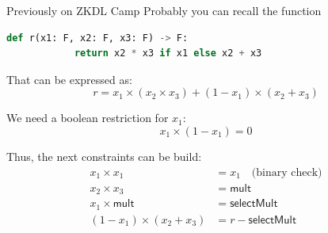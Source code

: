 \documentclass{zkdl-presentation-template}
\begin{document}
    \begin{frame}[fragile]{Previously on ZKDL Camp}
        Probably you can recall the function
        \begin{lstlisting}[language=Python,numbers=none]
        def r(x1: F, x2: F, x3: F) -> F:
            return x2 * x3 if x1 else x2 + x3
        \end{lstlisting}
        \vspace{-10pt}
        \pause That can be expressed as:
        \begin{equation*}
            r = x_1 \times (x_2 \times x_3) + (1 - x_1) \times (x_2 + x_3)
        \end{equation*}

        \pause
        \begin{alertblock}{}
            We need a boolean restriction for $x_1$:
            \vspace{-8pt}
            \begin{equation*}
                x_1 \times (1 - x_1) = 0
            \end{equation*}
        \end{alertblock}

        \pause
        Thus, the next constraints can be build:
        \vspace{-5pt}
        \begin{align*}
            x_1 \times x_1 &= x_1 \quad \text{(binary check)} \tag{1} \\
            x_2 \times x_3 &= \mathsf{mult} \tag{2} \\
            x_1 \times \mathsf{mult} &= \mathsf{selectMult} \tag{3} \\
            (1 - x_1) \times (x_2 + x_3) &= r - \mathsf{selectMult} \tag{4}
        \end{align*}
    \end{frame}
\end{document}
